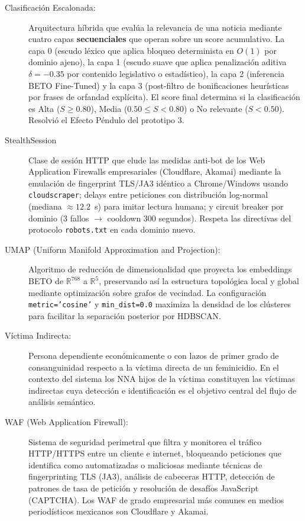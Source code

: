 \begin{description}
    \item[\hypertarget{tClasificacionEscalonada}{Clasificación Escalonada:}]
    Arquitectura híbrida que evalúa la relevancia de una noticia
    mediante cuatro capas \textbf{secuenciales} que operan sobre un score acumulativo.
    La capa 0 (escudo léxico que aplica bloqueo determinista en $O(1)$ por
    dominio ajeno), la capa 1 (escudo suave que aplica penalización aditiva $\delta=-0.35$ por
    contenido legislativo o estadístico), la capa 2 (inferencia BETO Fine-Tuned) y la capa 3
    (post-filtro de bonificaciones heurísticas por frases de orfandad explícita).
    El score final determina si la clasificación es Alta ($S \geq 0.80$), Media
    ($0.50 \leq S < 0.80$) o No relevante ($S < 0.50$). Resolvió el Efecto Péndulo
    del prototipo 3.

    \item[\hypertarget{tStealthSession}{StealthSession}]
    Clase de sesión HTTP que elude las medidas anti-bot de los Web Application
    Firewalls empresariales (Cloudflare, Akamai) mediante la emulación de fingerprint
    TLS/JA3 idéntico a Chrome/Windows usando \texttt{cloudscraper}; delays entre
    peticiones con distribución log-normal (mediana $\approx 12.2$~s) para imitar
    lectura humana; y circuit breaker por dominio (3 fallos $\to$ cooldown 300 segundos).
    Respeta las directivas del protocolo \texttt{robots.txt} en cada dominio nuevo.

    \item[\hypertarget{tUMAP}{UMAP (Uniform Manifold Approximation and Projection):}]
    Algoritmo de reducción de dimensionalidad que proyecta los embeddings BETO de
    $\mathbb{R}^{768}$ a $\mathbb{R}^5$, preservando así la estructura topológica local
    y global mediante optimización sobre grafos de vecindad.
    La configuración \texttt{metric='cosine'} y \texttt{min\_dist=0.0} maximiza la
    densidad de los clústeres para facilitar la separación posterior por HDBSCAN.

    \item[\hypertarget{tVictimaIndirecta}{Víctima Indirecta:}]
    Persona dependiente económicamente o con lazos de primer grado de consanguinidad
    respecto a la víctima directa de un feminicidio. En el contexto del sistema los
    NNA hijos de la víctima constituyen las víctimas indirectas cuya detección
    e identificación es el objetivo central del flujo de análisis semántico.

    \item[\hypertarget{tWAF}{WAF (Web Application Firewall):}]
    Sistema de seguridad perimetral que filtra y monitorea el tráfico HTTP/HTTPS entre
    un cliente e internet, bloqueando peticiones que identifica como automatizadas o
    maliciosas mediante técnicas de fingerprinting TLS (JA3), análisis de cabeceras
    HTTP, detección de patrones de tasa de petición y resolución de desafíos
    JavaScript (CAPTCHA). Los WAF de grado empresarial más comunes en medios
    periodísticos mexicanos son Cloudflare y Akamai.

\end{description}
